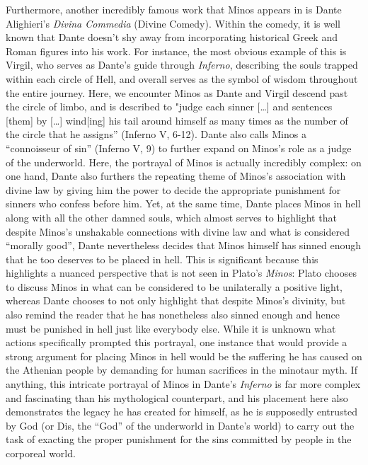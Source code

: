 \documentclass[12pt]{article}
\begin{document}
	Furthermore, another incredibly famous work that Minos appears in is Dante Alighieri's \textit{Divina 
	Commedia} (Divine Comedy). Within the comedy, it is well known that Dante doesn't shy away from incorporating 
	historical Greek and Roman figures into his work. For instance, the most obvious example of this is 
	Virgil, who serves as Dante's guide through \textit{Inferno}, describing the souls trapped within each 
	circle of Hell, and overall serves as the symbol of wisdom throughout the entire journey. Here, we encounter
	Minos as Dante and Virgil descend past the circle of limbo, and is described to "judge each sinner [\dots] and 
	sentences [them] by [\dots] wind[ing] his tail around himself as many times as the number of the circle 
	that he assigns'' (Inferno V, 6-12). Dante also calls Minos a ``connoisseur of sin'' (Inferno V, 9) to 
	further expand on Minos's role as a judge of the underworld. Here, the portrayal of Minos is actually incredibly 
	complex: on one hand, Dante also furthers the repeating theme of Minos's association with divine law by giving 
	him the power to decide the appropriate punishment for sinners who confess before him. Yet, at the same time, 
	Dante places Minos in hell along with all the other damned souls, which almost serves to highlight that 
	despite Minos's unshakable connections with divine law and what is considered ``morally good'', Dante 
	nevertheless decides that Minos himself has sinned enough that he too deserves to be placed in hell. This is 
	significant because this highlights a nuanced perspective that is not seen in Plato's \textit{Minos}:
	Plato chooses to discuss Minos in what can be considered to be unilaterally a positive light, whereas Dante 
	chooses to not only highlight that despite Minos's divinity, but also 
	remind the reader that he has nonetheless also sinned enough and hence must be punished in hell just like 
	everybody else. While it is unknown what actions specifically prompted this portrayal,
	one instance that would provide a strong argument for placing Minos 
	in hell would be the suffering he has caused on the Athenian people by demanding for human sacrifices 
	in the minotaur myth. If anything, this intricate portrayal of Minos in Dante's \textit{Inferno} 
	is far more complex and fascinating than his mythological counterpart, and his placement here also 
	demonstrates the legacy he has created for himself, as he is supposedly entrusted by God (or Dis, the ``God'' 
	of the underworld in Dante's world) to carry out the task of exacting the proper punishment for the sins committed
	by people in the corporeal world.
	
\end{document}
